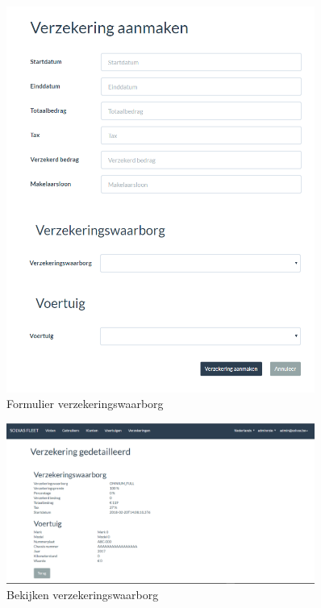 \documentclass[11pt,openany]{article}
\begin{document}
\begin{figure}
	\centering
	\includegraphics[width=0.9\textwidth]{img/fig_q.png}
	\caption{Formulier verzekeringswaarborg}
\end{figure}

\begin{figure}
	\centering
	\includegraphics[width=0.9\textwidth]{img/fig_r.png}
	\caption{Bekijken verzekeringswaarborg}
\end{figure}
\end{document}
